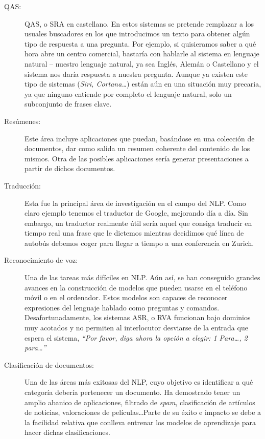 \begin{description}
  \item[QAS:] \ac{QAS}, o \ac{SRA} en castellano. En estos sistemas se pretende
    remplazar a los usuales buscadores en los que introducimos un texto para
    obtener algún tipo de respuesta a una pregunta. Por ejemplo, si quisieramos
    saber a qué hora abre un centro comercial, bastaría con hablarle al sistema
    en lenguaje natural -- nuestro lenguaje natural, ya sea Inglés, Alemán o
    Castellano y el sistema nos daría respuesta a nuestra pregunta. Aunque ya
    existen este tipo de sistemas (\eg \emph{Siri, Cortana\dots}) están aún en
    una situación muy precaria, ya que ninguno entiende por completo el lenguaje
    natural, solo un subconjunto de frases clave.
  \item[Resúmenes:] Este área incluye aplicaciones que puedan, basándose en una
    colección de documentos, dar como salida un resumen coherente del contenido
    de los mismos. Otra de las posibles aplicaciones sería generar
    presentaciones a partir de dichos documentos.
  \item[Traducción:] Esta fue la principal área de investigación en el campo del
    \ac{NLP}. Como claro ejemplo tenemos el traductor de Google, mejorando día a
    día. Sin embargo, un traductor realmente útil sería aquel que consiga
    traducir en tiempo real una frase que le dictemos mientras decidimos qué
    línea de autobús debemos coger para llegar a tiempo a una conferencia en
    Zurich.
  \item[Reconocimiento de voz:] Una de las tareas más difíciles en \ac{NLP}. Aún
    así, se han conseguido grandes avances en la construcción de modelos que
    pueden usarse en el teléfono móvil o en el ordenador. Estos modelos son
    capaces de reconocer expresiones del lenguaje hablado como preguntas y
    comandos. Desafortunadamente, los sistemas \ac{ASR}, o \ac{RVA} funcionan
    bajo dominios muy acotados y no permiten al interlocutor desviarse de la
    entrada que espera el sistema, \eg \emph{``Por favor, diga ahora la opción a
      elegir: 1 Para\dots, 2 para\dots''}
  \item[Clasificación de documentos:] Una de las áreas más exitosas del
    \ac{NLP}, cuyo objetivo es identificar a qué categoría debería pertenecer un
    documento. Ha demostrado tener un amplio abanico de aplicaciones, \eg
    filtrado de \emph{spam}, clasificación de artículos de noticias,
    valoraciones de películas\dots Parte de su éxito e impacto se debe a la
    facilidad relativa que conlleva entrenar los modelos de aprendizaje para
    hacer dichas clasificaciones.
\end{description}

